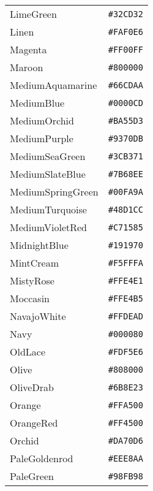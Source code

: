 \documentclass[a4paper]{article}
\begin{document}
\begin{longtable}{|l|r|}
LimeGreen & \texttt{\#32CD32} \cellcolor[HTML]{32CD32} \\
Linen & \texttt{\#FAF0E6} \cellcolor[HTML]{FAF0E6} \\
Magenta & \texttt{\#FF00FF} \cellcolor[HTML]{FF00FF} \\
Maroon & \texttt{\#800000} \cellcolor[HTML]{800000} \\
MediumAquamarine & \texttt{\#66CDAA} \cellcolor[HTML]{66CDAA} \\
MediumBlue & \texttt{\#0000CD} \cellcolor[HTML]{0000CD} \\
MediumOrchid & \texttt{\#BA55D3} \cellcolor[HTML]{BA55D3} \\
MediumPurple & \texttt{\#9370DB} \cellcolor[HTML]{9370DB} \\
MediumSeaGreen & \texttt{\#3CB371} \cellcolor[HTML]{3CB371} \\
MediumSlateBlue & \texttt{\#7B68EE} \cellcolor[HTML]{7B68EE} \\
MediumSpringGreen & \texttt{\#00FA9A} \cellcolor[HTML]{00FA9A} \\
MediumTurquoise & \texttt{\#48D1CC} \cellcolor[HTML]{48D1CC} \\
MediumVioletRed & \texttt{\#C71585} \cellcolor[HTML]{C71585} \\
MidnightBlue & \texttt{\#191970} \cellcolor[HTML]{191970} \\
MintCream & \texttt{\#F5FFFA} \cellcolor[HTML]{F5FFFA} \\
MistyRose & \texttt{\#FFE4E1} \cellcolor[HTML]{FFE4E1} \\
Moccasin & \texttt{\#FFE4B5} \cellcolor[HTML]{FFE4B5} \\
NavajoWhite & \texttt{\#FFDEAD} \cellcolor[HTML]{FFDEAD} \\
Navy & \texttt{\#000080} \cellcolor[HTML]{000080} \\
OldLace & \texttt{\#FDF5E6} \cellcolor[HTML]{FDF5E6} \\
Olive & \texttt{\#808000} \cellcolor[HTML]{808000} \\
OliveDrab & \texttt{\#6B8E23} \cellcolor[HTML]{6B8E23} \\
Orange & \texttt{\#FFA500} \cellcolor[HTML]{FFA500} \\
OrangeRed & \texttt{\#FF4500} \cellcolor[HTML]{FF4500} \\
Orchid & \texttt{\#DA70D6} \cellcolor[HTML]{DA70D6} \\
PaleGoldenrod & \texttt{\#EEE8AA} \cellcolor[HTML]{EEE8AA} \\
PaleGreen & \texttt{\#98FB98} \cellcolor[HTML]{98FB98} \\

\end{longtable}
\end{document}
